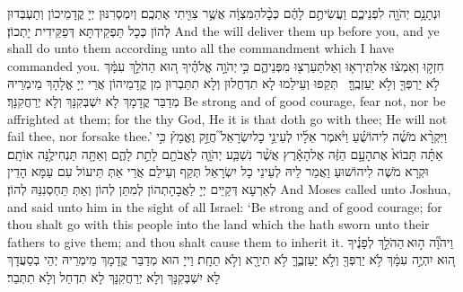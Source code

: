 {וּנְתָנָ֥ם יְהֹוָ֖ה לִפְנֵיכֶ֑ם וַעֲשִׂיתֶ֣ם לָהֶ֔ם כְּכׇ֨ל\maqqaf הַמִּצְוָ֔ה אֲשֶׁ֥ר צִוִּ֖יתִי אֶתְכֶֽם׃}
{וְיִמְסְרִנּוּן יְיָ קֳדָמֵיכוֹן וְתַעְבְּדוּן לְהוֹן כְּכָל תַּפְקֵידְתָּא דְּפַקֵּידִית יָתְכוֹן׃}
{And the \lord\space will deliver them up before you, and ye shall do unto them according unto all the commandment which I have commanded you.}{}
{חִזְק֣וּ וְאִמְצ֔וּ אַל\maqqaf תִּֽירְא֥וּ וְאַל\maqqaf תַּעַרְצ֖וּ מִפְּנֵיהֶ֑ם כִּ֣י \legarmeh  יְהֹוָ֣ה אֱלֹהֶ֗יךָ ה֚וּא הַהֹלֵ֣ךְ עִמָּ֔ךְ לֹ֥א יַרְפְּךָ֖ וְלֹ֥א יַעַזְבֶֽךָּ׃ \setuma }
{תְּקַפוּ וְעֵילַמוּ לָא תִדְחֲלוּן וְלָא תִתַּבְרוּן מִן קֳדָמֵיהוֹן אֲרֵי יְיָ אֱלָהָךְ מֵימְרֵיהּ מְדַבַּר קֳדָמָךְ לָא יִשְׁבְּקִנָּךְ וְלָא יְרַחֲקִנָּךְ׃}
{Be strong and of good courage, fear not, nor be affrighted at them; for the \lord\space thy God, He it is that doth go with thee; He will not fail thee, nor forsake thee.’}{}
{וַיִּקְרָ֨א מֹשֶׁ֜ה לִיהוֹשֻׁ֗עַ וַיֹּ֨אמֶר אֵלָ֜יו לְעֵינֵ֣י כׇל\maqqaf יִשְׂרָאֵל֮ חֲזַ֣ק וֶאֱמָץ֒ כִּ֣י אַתָּ֗ה תָּבוֹא֙ אֶת\maqqaf הָעָ֣ם הַזֶּ֔ה אֶל\maqqaf הָאָ֕רֶץ אֲשֶׁ֨ר נִשְׁבַּ֧ע יְהֹוָ֛ה לַאֲבֹתָ֖ם לָתֵ֣ת לָהֶ֑ם וְאַתָּ֖ה תַּנְחִילֶ֥נָּה אוֹתָֽם׃}
{וּקְרָא מֹשֶׁה לִיהוֹשׁוּעַ וַאֲמַר לֵיהּ לְעֵינֵי כָל יִשְׂרָאֵל תְּקַף וְעֵילַם אֲרֵי אַתְּ תֵּיעוֹל עִם עַמָּא הָדֵין לְאַרְעָא דְּקַיֵּים יְיָ לַאֲבָהָתְהוֹן לְמִתַּן לְהוֹן וְאַתְּ תַּחְסְנִנַּהּ לְהוֹן׃}
{And Moses called unto Joshua, and said unto him in the sight of all Israel: ‘Be strong and of good courage; for thou shalt go with this people into the land which the \lord\space hath sworn unto their fathers to give them; and thou shalt cause them to inherit it.}{}
{וַיהֹוָ֞ה ה֣וּא \legarmeh  הַהֹלֵ֣ךְ לְפָנֶ֗יךָ ה֚וּא יִהְיֶ֣ה עִמָּ֔ךְ לֹ֥א יַרְפְּךָ֖ וְלֹ֣א יַעַזְבֶ֑ךָּ לֹ֥א תִירָ֖א וְלֹ֥א תֵחָֽת׃}
{וַייָ הוּא מְדַבַּר קֳדָמָךְ מֵימְרֵיהּ יְהֵי בְסַעֲדָךְ לָא יִשְׁבְּקִנָּךְ וְלָא יְרַחֲקִנָּךְ לָא תִדְחַל וְלָא תִתְּבַר׃}
